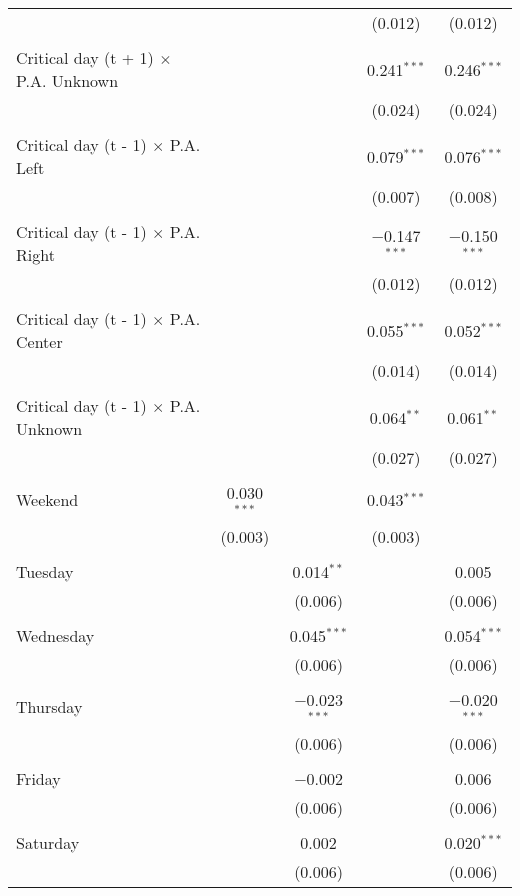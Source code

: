 \documentclass[
]{article}
\begin{document}
\begin{table}[!htbp]
{\begin{tabular}{@{\extracolsep{5pt}}lcccc}
  &  &  & (0.012) & (0.012) \\ 
  & & & & \\ 
 Critical day (t + 1) $\times$ P.A. Unknown &  &  & 0.241$^{***}$ & 0.246$^{***}$ \\ 
  &  &  & (0.024) & (0.024) \\ 
  & & & & \\ 
 Critical day (t - 1) $\times$ P.A. Left &  &  & 0.079$^{***}$ & 0.076$^{***}$ \\ 
  &  &  & (0.007) & (0.008) \\ 
  & & & & \\ 
 Critical day (t - 1) $\times$ P.A. Right &  &  & $-$0.147$^{***}$ & $-$0.150$^{***}$ \\ 
  &  &  & (0.012) & (0.012) \\ 
  & & & & \\ 
 Critical day (t - 1) $\times$ P.A. Center &  &  & 0.055$^{***}$ & 0.052$^{***}$ \\ 
  &  &  & (0.014) & (0.014) \\ 
  & & & & \\ 
 Critical day (t - 1) $\times$ P.A. Unknown &  &  & 0.064$^{**}$ & 0.061$^{**}$ \\ 
  &  &  & (0.027) & (0.027) \\ 
  & & & & \\ 
 Weekend & 0.030$^{***}$ &  & 0.043$^{***}$ &  \\ 
  & (0.003) &  & (0.003) &  \\ 
  & & & & \\ 
 Tuesday &  & 0.014$^{**}$ &  & 0.005 \\ 
  &  & (0.006) &  & (0.006) \\ 
  & & & & \\ 
 Wednesday &  & 0.045$^{***}$ &  & 0.054$^{***}$ \\ 
  &  & (0.006) &  & (0.006) \\ 
  & & & & \\ 
 Thursday &  & $-$0.023$^{***}$ &  & $-$0.020$^{***}$ \\ 
  &  & (0.006) &  & (0.006) \\ 
  & & & & \\ 
 Friday &  & $-$0.002 &  & 0.006 \\ 
  &  & (0.006) &  & (0.006) \\ 
  & & & & \\ 
 Saturday &  & 0.002 &  & 0.020$^{***}$ \\ 
  &  & (0.006) &  & (0.006) \\ 

\end{tabular}}
\end{table}
\end{document}
